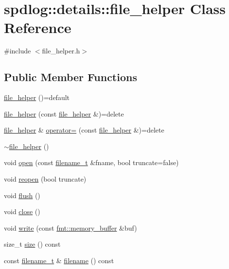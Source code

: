 \hypertarget{classspdlog_1_1details_1_1file__helper}{}\section{spdlog\+:\+:details\+:\+:file\+\_\+helper Class Reference}
\label{classspdlog_1_1details_1_1file__helper}


{\ttfamily \#include $<$file\+\_\+helper.\+h$>$}

\subsection*{Public Member Functions}
\begin{DoxyCompactItemize}
\item 
\hyperlink{classspdlog_1_1details_1_1file__helper_aa11a5129c9d7492638a68d849d66d47d}{file\+\_\+helper} ()=default
\item 
\hyperlink{classspdlog_1_1details_1_1file__helper_ab68b7720555f7656a8f387f8e0dcb37d}{file\+\_\+helper} (const \hyperlink{classspdlog_1_1details_1_1file__helper}{file\+\_\+helper} \&)=delete
\item 
\hyperlink{classspdlog_1_1details_1_1file__helper}{file\+\_\+helper} \& \hyperlink{classspdlog_1_1details_1_1file__helper_a7c7314360e404efa02326feb7aa98442}{operator=} (const \hyperlink{classspdlog_1_1details_1_1file__helper}{file\+\_\+helper} \&)=delete
\item 
\hyperlink{classspdlog_1_1details_1_1file__helper_aad84ef5f999c2721a0a8ad36ce641e8c}{$\sim$file\+\_\+helper} ()
\item 
void \hyperlink{classspdlog_1_1details_1_1file__helper_a8612066fd098080cc60e3aefed6a6085}{open} (const \hyperlink{namespacespdlog_acf7ce125b3622e44f8f1702d699e0b06}{filename\+\_\+t} \&fname, bool truncate=false)
\item 
void \hyperlink{classspdlog_1_1details_1_1file__helper_a21c688da7f241c53871b462c3a5c2c94}{reopen} (bool truncate)
\item 
void \hyperlink{classspdlog_1_1details_1_1file__helper_a1a75f29ec0c13d9fbc269bcd8378b18b}{flush} ()
\item 
void \hyperlink{classspdlog_1_1details_1_1file__helper_a6a6d7a75014ae880857b4fe4fd01dc7a}{close} ()
\item 
void \hyperlink{classspdlog_1_1details_1_1file__helper_a51eb58a2d46f1896f3ab7b9d323d97ae}{write} (const \hyperlink{format_8h_a21cbf729f69302f578e6db21c5e9e0d2}{fmt\+::memory\+\_\+buffer} \&buf)
\item 
size\+\_\+t \hyperlink{classspdlog_1_1details_1_1file__helper_ae945d9701134218c2d0558958e9d1cf2}{size} () const
\item 
const \hyperlink{namespacespdlog_acf7ce125b3622e44f8f1702d699e0b06}{filename\+\_\+t} \& \hyperlink{classspdlog_1_1details_1_1file__helper_a76610058a1769b25bd6ed52a1443b552}{filename} () const
\end{DoxyCompactItemize}
